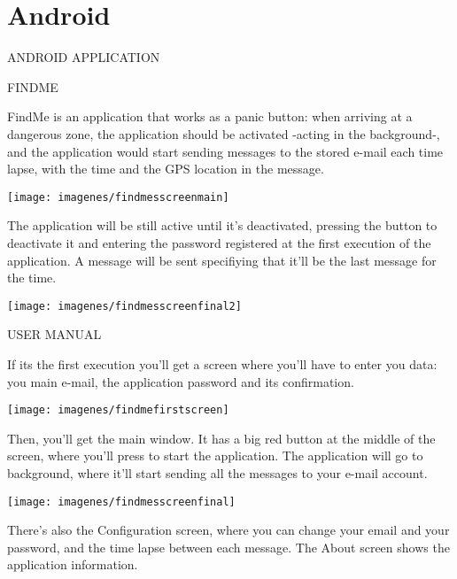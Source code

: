 \chapter{Android}

ANDROID APPLICATION  


FINDME 


FindMe is an application that works as a panic button: when arriving at a dangerous zone, the application should be activated -acting in the background-, and the application would start sending messages to the stored e-mail each time lapse, with the time and the GPS location in the message.

\centerline{\texttt{[image: imagenes/findmesscreenmain]} }

The application will be still active until it's deactivated, pressing the button to deactivate it and entering the password registered at the first execution of the application. A message will be sent specifiying that it'll be the last message for the time.

\centerline{\texttt{[image: imagenes/findmesscreenfinal2]}}

USER MANUAL

If its the first execution you'll get a screen where you'll have to enter you data: you main e-mail, the application password and its confirmation.

\centerline{\texttt{[image: imagenes/findmefirstscreen]}}

Then, you'll get the main window. It has a big red button at the middle of the screen, where you'll press to start the application. The application will go to background, where it'll start sending all the messages to your e-mail account.

\centerline{\texttt{[image: imagenes/findmesscreenfinal]}}

There's also the Configuration screen, where you can change your email and your password, and the time lapse between each message.
The About screen shows the application information.
